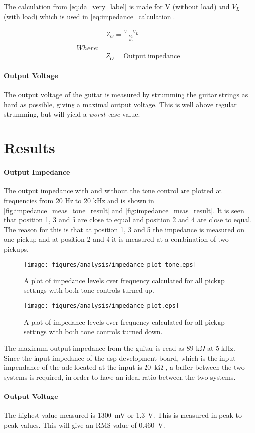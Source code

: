The calculation from \autoref{eq:da_very_label} is made for V (without load) and $V_L$ (with load) which is used in \autoref{eq:impedance_calculation}.  

\begin{align}	
	&Z_O=\frac{V-V_L}{\frac{V_L}{R_L}} \label{eq:impedance_calculation} \\
	Where:& \nonumber \\
	&Z_O = \text{Output impedance} \nonumber
\end{align}	

\paragraph{Output Voltage}
The output voltage of the guitar is measured by strumming the guitar strings as hard as possible, giving a maximal output voltage. This is well above regular strumming, but will yield a \textit{worst case} value.

\section{Results}
\paragraph{Output Impedance}
The output impedance with and without the tone control are plotted at frequencies from 20 Hz to 20 kHz and is shown in \autoref{fig:impedance_meas_tone_result} and \autoref{fig:impedance_meas_result}. It is seen that position 1, 3 and 5 are close to equal and position 2 and 4 are close to equal. The reason for this is that at position 1, 3 and 5 the impedance is measured on one pickup and at position 2 and 4 it is measured at a combination of two pickups.  
\begin{figure}[htbp]
	\centering
	\texttt{[image: figures/analysis/impedance\_plot\_tone.eps]}
	\caption{A plot of impedance levels over frequency calculated for all pickup settings with both tone controls turned up.}
	\label{fig:impedance_meas_tone_result}
\end{figure}

\begin{figure}[htbp]
	\centering
	\texttt{[image: figures/analysis/impedance\_plot.eps]}
	\caption{A plot of impedance levels over frequency calculated for all pickup settings with both tone controls turned down.}
	\label{fig:impedance_meas_result}
\end{figure}

The maximum output impedance from the guitar is read as $89 \text{ k}\Omega$ at 5 kHz. Since the input impedance of the \gls{dsp} development board, which is the input impendance of the \gls{adc} located at the input is \SI{20}{\kilo\ohm} \citep{dspadc}, a buffer between the two systems is required, in order to have an ideal ratio between the two systems. 

\paragraph{Output Voltage}
The highest value measured is \SI{1300}{\milli\volt} or \SI{1.3}{\volt}. This is measured in peak-to-peak values.
This will give an RMS value of \SI{0.460}{\volt}. 
